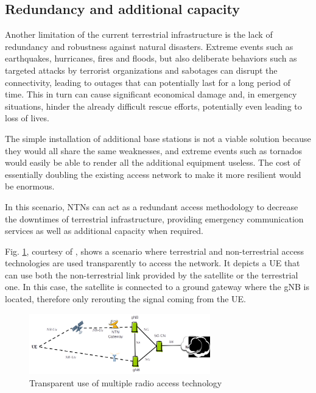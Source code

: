 \subsection{Redundancy and additional capacity}
Another limitation of the current terrestrial infrastructure is the lack of redundancy and robustness against natural disasters. Extreme events such as earthquakes, hurricanes, fires and floods, but also deliberate behaviors such as targeted attacks by terrorist organizations and sabotages can disrupt the connectivity, leading to outages that can potentially last for a long period of time. This in turn can cause significant economical damage and, in emergency situations, hinder the already difficult rescue efforts, potentially even leading to loss of lives.

The simple installation of additional base stations is not a viable solution because they would all share the same weaknesses, and extreme events such as tornados would easily be able to render all the additional equipment useless. The cost of essentially doubling the existing access network to make it more resilient would be enormous.

In this scenario, \ac{NTNs} can act as a redundant access methodology to decrease the downtimes of terrestrial infrastructure, providing emergency communication services as well as additional capacity when required.

Fig. \ref{fig:multiple-connectivity}, courtesy of \cite{3gpp-tr-38.811}, shows a scenario where terrestrial and non-terrestrial access technologies are used transparently to access the network. It depicts a \ac{UE} that can use both the non-terrestrial link provided by the satellite or the terrestrial one. In this case, the satellite is connected to a ground gateway where the \ac{gNB} is located, therefore only rerouting the signal coming from the \ac{UE}.

\begin{figure}[ht]
    \centering
    \includegraphics[width=0.7\textwidth]{res/multiple-connectivity.png}
    \caption{Transparent use of multiple radio access technology \cite{3gpp-tr-38.811}}
    \label{fig:multiple-connectivity}
\end{figure}

